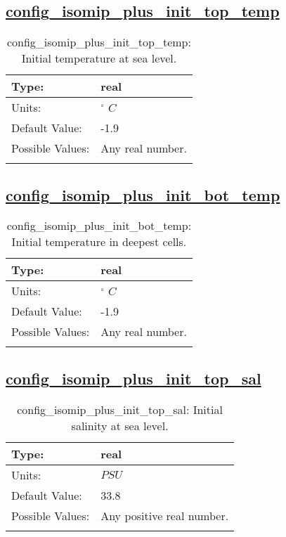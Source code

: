 \subsection[config\_isomip\_plus\_init\_top\_temp]{\hyperref[sec:nm_tab_isomip_plus]{config\_isomip\_plus\_init\_top\_temp}}
\label{subsec:nm_sec_config_isomip_plus_init_top_temp}
\begin{center}
\begin{longtable}{| p{2.0in} || p{4.0in} |}
    \hline
    Type: & real \\
    \hline
    Units: & $^\circ$ $C$ \\
    \hline
    Default Value: & -1.9 \\
    \hline
    Possible Values: & Any real number. \\
    \hline
    \caption{config\_isomip\_plus\_init\_top\_temp: Initial temperature at sea level.}
\end{longtable}
\end{center}
\subsection[config\_isomip\_plus\_init\_bot\_temp]{\hyperref[sec:nm_tab_isomip_plus]{config\_isomip\_plus\_init\_bot\_temp}}
\label{subsec:nm_sec_config_isomip_plus_init_bot_temp}
\begin{center}
\begin{longtable}{| p{2.0in} || p{4.0in} |}
    \hline
    Type: & real \\
    \hline
    Units: & $^\circ$ $C$ \\
    \hline
    Default Value: & -1.9 \\
    \hline
    Possible Values: & Any real number. \\
    \hline
    \caption{config\_isomip\_plus\_init\_bot\_temp: Initial temperature in deepest cells.}
\end{longtable}
\end{center}
\subsection[config\_isomip\_plus\_init\_top\_sal]{\hyperref[sec:nm_tab_isomip_plus]{config\_isomip\_plus\_init\_top\_sal}}
\label{subsec:nm_sec_config_isomip_plus_init_top_sal}
\begin{center}
\begin{longtable}{| p{2.0in} || p{4.0in} |}
    \hline
    Type: & real \\
    \hline
    Units: & $PSU$ \\
    \hline
    Default Value: & 33.8 \\
    \hline
    Possible Values: & Any positive real number. \\
    \hline
    \caption{config\_isomip\_plus\_init\_top\_sal: Initial salinity at sea level.}
\end{longtable}
\end{center}
